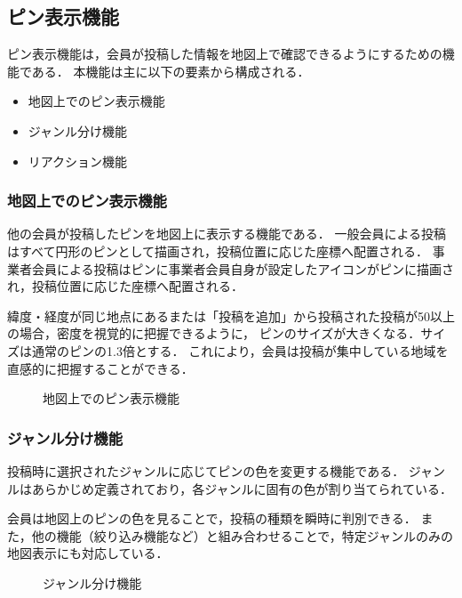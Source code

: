 \subsection{ピン表示機能}
ピン表示機能は，会員が投稿した情報を地図上で確認できるようにするための機能である．
本機能は主に以下の要素から構成される．

\begin{itemize}
  \item 地図上でのピン表示機能
  \item ジャンル分け機能
  \item リアクション機能
\end{itemize}

\subsubsection{地図上でのピン表示機能}
他の会員が投稿したピンを地図上に表示する機能である．
一般会員による投稿はすべて円形のピンとして描画され，投稿位置に応じた座標へ配置される．
事業者会員による投稿はピンに事業者会員自身が設定したアイコンがピンに描画され，投稿位置に応じた座標へ配置される．

緯度・経度が同じ地点にあるまたは「投稿を追加」から投稿された投稿が50以上の場合，密度を視覚的に把握できるように，
ピンのサイズが大きくなる．サイズは通常のピンの1.3倍とする．
これにより，会員は投稿が集中している地域を直感的に把握することができる．

\begin{figure}[H]
    \centering
    
    \caption{地図上でのピン表示機能}
    \label{fig:pinView_gene}
\end{figure}



\subsubsection{ジャンル分け機能}
投稿時に選択されたジャンルに応じてピンの色を変更する機能である．
ジャンルはあらかじめ定義されており，各ジャンルに固有の色が割り当てられている．

会員は地図上のピンの色を見ることで，投稿の種類を瞬時に判別できる．
また，他の機能（絞り込み機能など）と組み合わせることで，特定ジャンルのみの地図表示にも対応している．

\begin{figure}[H]
    \centering
    
    \caption{ジャンル分け機能}
    \label{fig:pinViewGenre}
\end{figure}


